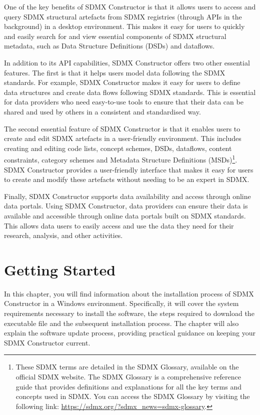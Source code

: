 \documentclass[
]{book}
\begin{document}
One of the key benefits of SDMX Constructor is that it allows users to access and query SDMX structural artefacts from SDMX registries (through APIs in the background) in a desktop environment. This makes it easy for users to quickly and easily search for and view essential components of SDMX structural metadata, such as Data Structure Definitions (DSDs) and dataflows.

In addition to its API capabilities, SDMX Constructor offers two other essential features. The first is that it helps users model data following the SDMX standards. For example, SDMX Constructor makes it easy for users to define data structures and create data flows following SDMX standards. This is essential for data providers who need easy-to-use tools to ensure that their data can be shared and used by others in a consistent and standardised way.

The second essential feature of SDMX Constructor is that it enables users to create and edit SDMX artefacts in a user-friendly environment. This includes creating and editing code lists, concept schemes, DSDs, dataflows, content constraints, category schemes and Metadata Structure Definitions (MSDs)\footnote{These SDMX terms are detailed in the SDMX Glossary, available on the official SDMX website. The SDMX Glossary is a comprehensive reference guide that provides definitions and explanations for all the key terms and concepts used in SDMX. You can access the SDMX Glossary by visiting the following link: \url{https://sdmx.org/?sdmx_news=sdmx-glossary}.}. SDMX Constructor provides a user-friendly interface that makes it easy for users to create and modify these artefacts without needing to be an expert in SDMX.

Finally, SDMX Constructor supports data availability and access through online data portals. Using SDMX Constructor, data providers can ensure their data is available and accessible through online data portals built on SDMX standards. This allows data users to easily access and use the data they need for their research, analysis, and other activities.

\hypertarget{getting-started}{%
\chapter{Getting Started}\label{getting-started}}

In this chapter, you will find information about the installation process of SDMX Constructor in a Windows environment. Specifically, it will cover the system requirements necessary to install the software, the steps required to download the executable file and the subsequent installation process. The chapter will also explain the software update process, providing practical guidance on keeping your SDMX Constructor current.
\end{document}
